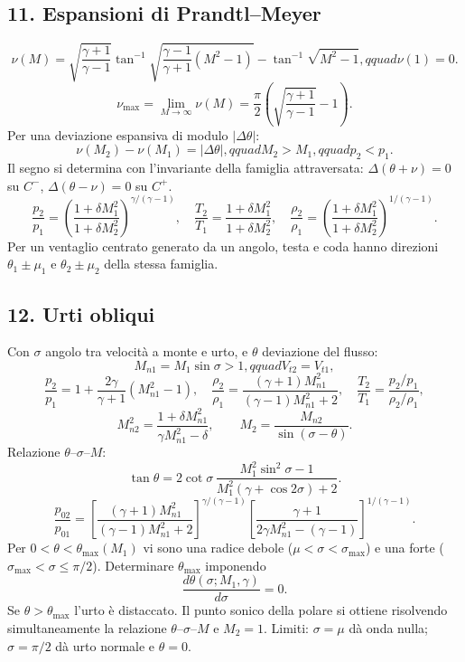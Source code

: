 \documentclass[11pt,a4paper]{article}
\begin{document}
\subsection*{11. Espansioni di Prandtl--Meyer}

\[
\nu(M)=\sqrt{\frac{\gamma+1}{\gamma-1}}
\tan^{-1}\sqrt{\frac{\gamma-1}{\gamma+1}(M^2-1)}
-\tan^{-1}\sqrt{M^2-1},qquad \nu(1)=0.
\]
\[
\nu_{\max}=\lim_{M\to\infty}\nu(M)
=\frac\pi2\left(\sqrt{\frac{\gamma+1}{\gamma-1}}-1\right).
\]
Per una deviazione espansiva di modulo $|\Delta\theta|$:
\[
\nu(M_2)-\nu(M_1)=|\Delta\theta|,qquad M_2>M_1,qquad p_2<p_1.
\]
Il segno si determina con l'invariante della famiglia attraversata:
$\Delta(\theta+\nu)=0$ su $C^-$, $\Delta(\theta-\nu)=0$ su $C^+$.
\[
\frac{p_2}{p_1}=\left(\frac{1+\delta M_1^2}{1+\delta M_2^2}\right)^{\gamma/(\gamma-1)},
\quad
\frac{T_2}{T_1}=\frac{1+\delta M_1^2}{1+\delta M_2^2},
\quad
\frac{\rho_2}{\rho_1}=\left(\frac{1+\delta M_1^2}{1+\delta M_2^2}\right)^{1/(\gamma-1)}.
\]
Per un ventaglio centrato generato da un angolo, testa e coda hanno direzioni
$\theta_1\pm\mu_1$ e $\theta_2\pm\mu_2$ della stessa famiglia.


\subsection*{12. Urti obliqui}

Con $\sigma$ angolo tra velocità a monte e urto, e $\theta$ deviazione del flusso:
\[
M_{n1}=M_1\sin\sigma>1,qquad V_{t2}=V_{t1},
\]
\[
\frac{p_2}{p_1}=1+\frac{2\gamma}{\gamma+1}(M_{n1}^2-1),
\quad
\frac{\rho_2}{\rho_1}=\frac{(\gamma+1)M_{n1}^2}{(\gamma-1)M_{n1}^2+2},
\quad
\frac{T_2}{T_1}=\frac{p_2/p_1}{\rho_2/\rho_1},
\]
\[
M_{n2}^2=\frac{1+\delta M_{n1}^2}{\gamma M_{n1}^2-\delta},
\qquad M_2=\frac{M_{n2}}{\sin(\sigma-\theta)}.
\]
Relazione $\theta$--$\sigma$--$M$:
\[
\tan\theta=2\cot\sigma\,
\frac{M_1^2\sin^2\sigma-1}{M_1^2(\gamma+\cos2\sigma)+2}.
\]
\[
\frac{p_{02}}{p_{01}}=
\left[\frac{(\gamma+1)M_{n1}^2}{(\gamma-1)M_{n1}^2+2}\right]^{\gamma/(\gamma-1)}
\left[\frac{\gamma+1}{2\gamma M_{n1}^2-(\gamma-1)}\right]^{1/(\gamma-1)}.
\]
Per $0<\theta<\theta_{\max}(M_1)$ vi sono una radice debole
($\mu<\sigma<\sigma_{\max}$) e una forte ($\sigma_{\max}<\sigma\le\pi/2$).
Determinare $\theta_{\max}$ imponendo
\[
\frac{d\theta(\sigma;M_1,\gamma)}{d\sigma}=0.
\]
Se $\theta>\theta_{\max}$ l'urto è distaccato. Il punto sonico della polare si ottiene
risolvendo simultaneamente la relazione $\theta$--$\sigma$--$M$ e $M_2=1$.
Limiti: $\sigma=\mu$ dà onda nulla; $\sigma=\pi/2$ dà urto normale e $\theta=0$.
\end{document}
